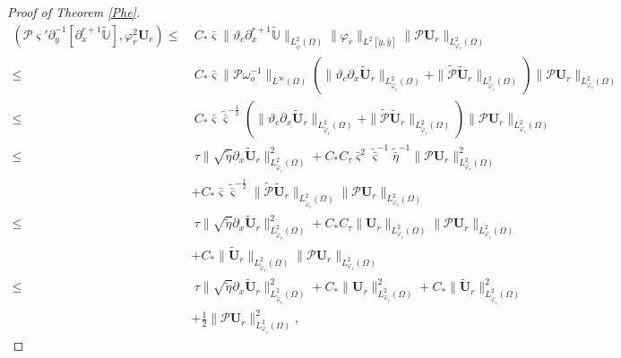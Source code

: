 \documentclass[10pt,a4paper]{amsart}
\begin{document}
\begin{proof}[Proof of Theorem \ref{Phe}]
\begin{align}
(\mathcal{P}\varsigma'\partial_{y}^{-1}[\partial_{x}^{r+1}\tilde{\mathbb{U}}],\varphi_{r}^{2}\mathbf{U}_{r})
\leq&~C_{*}\bar{\varsigma}\|\vartheta_{c}\partial_{x}^{r+1}\tilde{\mathbb{U}}\|_{L_{\check{\psi}}^{2}(\Omega)}
                 \|\varphi_{r}\|_{L^{2}[\check{y},\hat{y}]}
                 \|\mathcal{P}\mathbf{U}_{r}\|_{L_{\varphi_{r}}^{2}(\Omega)}\\
\leq&~C_{*}\bar{\varsigma}\|\mathcal{P}\omega_{o}^{-1}\|_{L^{\infty}(\Omega)}
      \left(\|\vartheta_{c}\partial_{x}\tilde{\mathbf{U}}_{r}\|_{L_{\tilde{\varphi}_{r}}^{2}(\Omega)}
            +\|\tilde{\mathcal{P}}\tilde{\mathbf{U}}_{r}\|_{L_{\tilde{\varphi}_{r}}^{2}(\Omega)}\right)
      \|\mathcal{P}\mathbf{U}_{r}\|_{L_{\varphi_{r}}^{2}(\Omega)}\nonumber\\
\leq&~C_{*}\bar{\varsigma}\tilde{\bar{\varsigma}}^{-\frac{1}{2}}
      \left(\|\vartheta_{c}\partial_{x}\tilde{\mathbf{U}}_{r}\|_{L_{\tilde{\varphi}_{r}}^{2}(\Omega)}
            +\|\tilde{\mathcal{P}}\tilde{\mathbf{U}}_{r}\|_{L_{\tilde{\varphi}_{r}}^{2}(\Omega)}\right)
      \|\mathcal{P}\mathbf{U}_{r}\|_{L_{\varphi_{r}}^{2}(\Omega)}\nonumber\\
\leq&~\tau\|\sqrt{\tilde{\eta}}\partial_{x}\tilde{\mathbf{U}}_{r}\|_{L_{\tilde{\varphi}_{r}}^{2}(\Omega)}^{2}
     +C_{*}C_{\tau}\bar{\varsigma}^{2}\tilde{\bar{\varsigma}}^{-1}\tilde{\bar{\eta}}^{-1}\|\mathcal{P}\mathbf{U}_{r}\|_{L_{\varphi_{r}}^{2}(\Omega)}^{2}\nonumber\\
    &+C_{*}\bar{\varsigma}\tilde{\bar{\varsigma}}^{-\frac{1}{2}}\|\tilde{\mathcal{P}}\tilde{\mathbf{U}}_{r}\|_{L_{\tilde{\varphi}_{r}}^{2}(\Omega)}
                                              \|\mathcal{P}\mathbf{U}_{r}\|_{L_{\varphi_{r}}^{2}(\Omega)}\nonumber\\
\leq&~\tau\|\sqrt{\tilde{\eta}}\partial_{x}\tilde{\mathbf{U}}_{r}\|_{L_{\tilde{\varphi}_{r}}^{2}(\Omega)}^{2}
     +C_{*}C_{\tau}\|\mathbf{U}_{r}\|_{L_{\varphi_{r}}^{2}(\Omega)}\|\mathcal{P}\mathbf{U}_{r}\|_{L_{\varphi_{r}}^{2}(\Omega)}\nonumber\\
    &+C_{*}\|\tilde{\mathbf{U}}_{r}\|_{L_{\tilde{\varphi}_{r}}^{2}(\Omega)}\|\mathcal{P}\mathbf{U}_{r}\|_{L_{\varphi_{r}}^{2}(\Omega)}\nonumber\\
\leq&~\tau\|\sqrt{\tilde{\eta}}\partial_{x}\tilde{\mathbf{U}}_{r}\|_{L_{\tilde{\varphi}_{r}}^{2}(\Omega)}^{2}
     +C_{*}\|\mathbf{U}_{r}\|_{L_{\varphi_{r}}^{2}(\Omega)}^{2}
     +C_{*}\|\tilde{\mathbf{U}}_{r}\|_{L_{\tilde{\varphi}_{r}}^{2}(\Omega)}^{2}\nonumber\\
    &+\frac{1}{2}\|\mathcal{P}\mathbf{U}_{r}\|_{L_{\varphi_{r}}^{2}(\Omega)}^{2},\nonumber

\end{align}
\end{proof}
\end{document}
